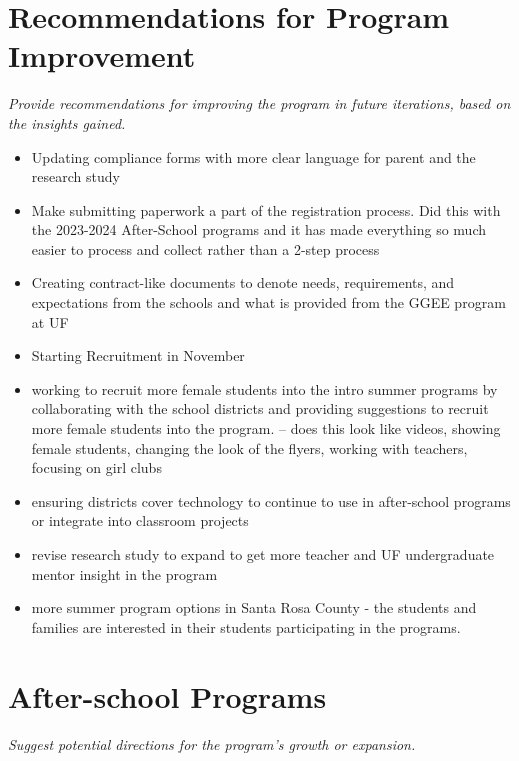 \documentclass[
]{article}
\providecommand{\tightlist}{%
  \setlength{\itemsep}{0pt}\setlength{\parskip}{0pt}}
\begin{document}
\hypertarget{recommendations-for-program-improvement}{%
\section{Recommendations for Program
Improvement}\label{recommendations-for-program-improvement}}

\emph{Provide recommendations for improving the program in future
iterations, based on the insights gained.}

\begin{itemize}
\tightlist
\item
  Updating compliance forms with more clear language for parent and the
  research study
\item
  Make submitting paperwork a part of the registration process. Did this
  with the 2023-2024 After-School programs and it has made everything so
  much easier to process and collect rather than a 2-step process
\item
  Creating contract-like documents to denote needs, requirements, and
  expectations from the schools and what is provided from the GGEE
  program at UF
\item
  Starting Recruitment in November
\item
  working to recruit more female students into the intro summer programs
  by collaborating with the school districts and providing suggestions
  to recruit more female students into the program. -- does this look
  like videos, showing female students, changing the look of the flyers,
  working with teachers, focusing on girl clubs
\item
  ensuring districts cover technology to continue to use in after-school
  programs or integrate into classroom projects
\item
  revise research study to expand to get more teacher and UF
  undergraduate mentor insight in the program
\item
  more summer program options in Santa Rosa County - the students and
  families are interested in their students participating in the
  programs.
\end{itemize}

\hypertarget{after-school-programs}{%
\section{After-school Programs}\label{after-school-programs}}

\emph{Suggest potential directions for the program's growth or
expansion.}
\end{document}
